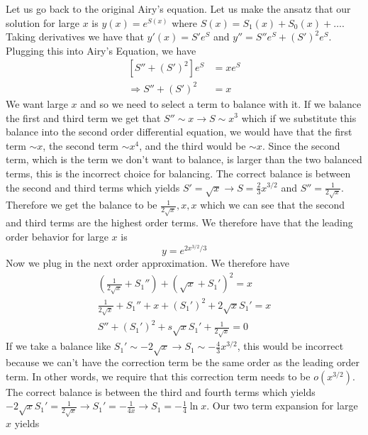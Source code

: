 \documentclass{article}
\begin{document}
Let us go back to the original Airy's equation. Let us make the ansatz that our solution for large $x$ is $y(x)=e^{S(x)}$ where $S(x)=S_1(x)+S_0(x)+\ldots$. Taking derivatives we have that $y'(x)=S'e^S$ and $y''=S''e^S+(S')^2e^S$. Plugging this into Airy's Equation, we have 
\begin{equation}
    \begin{split}
        [S''+(S')^2]e^{S} &= xe^S \\
        \Rightarrow S''+(S')^2&=x
    \end{split}
\end{equation}
We want large $x$ and so we need to select a term to balance with it. If we balance the first and third term we get  that $S'' \sim x \rightarrow S\sim x^3$ which if we substitute this balance into the second order differential equation, we would have that the first term $\sim x$, the second term $\sim x^4$, and the third would be $\sim x$. Since the second term, which is the term we don't want to balance, is larger than the two balanced terms, this is the incorrect choice for balancing. The correct balance is between the second and third terms which yields $S' =\sqrt{x} \rightarrow S=\frac{2}{3}x^{3/2}$ and $S'' = \frac{1}{2\sqrt x}$. Therefore we get the balance to be $\frac{1}{2\sqrt x},x,x$ which we can see that the second and third terms are the highest order terms. We therefore have that the leading order behavior for large $x$ is 
\begin{equation*}
    y=e^{2x^{3/2}/3}
\end{equation*}
Now we plug in the next order approximation. We therefore have 
\begin{equation*}
    \begin{split}
        \left( \frac{1}{2\sqrt x} +S_1''
        \right) + \left( \sqrt{x}+S_1'\right)^2=x \\
        \frac{1}{2\sqrt{x}}+S_1''+x+(S_1')^2+2\sqrt{x}S_1' =x\\
        S''+(S_1')^2+s\sqrt x S_1'+\frac{1}{2\sqrt x} =0
    \end{split}
\end{equation*}
If we take a balance like $S_1' \sim -2\sqrt{x}\rightarrow S_1\sim -\frac{4}{3}x^{3/2}$, this would be incorrect because we can't have the correction term be the same order as the leading order term. In other words, we require that this correction term needs to be $o(x^{3/2})$. The correct balance is between the third and fourth terms which yields $-2\sqrt{x}S_1'= \frac{1}{2\sqrt x} \rightarrow S_1'= -\frac{1}{4x} \rightarrow S_1 = -\frac{1}{4}\ln x$. Our two term expansion for large $x$ yields 
\end{document}
